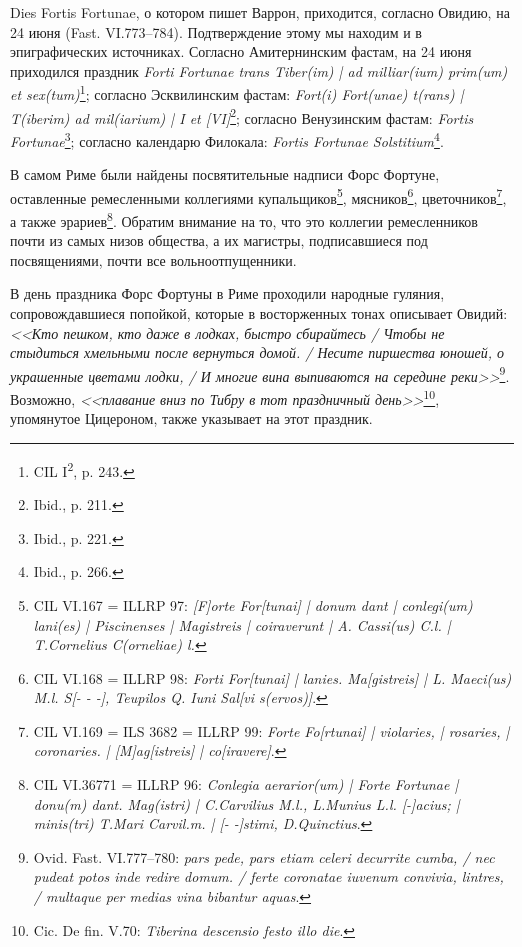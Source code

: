 
Dies Fortis Fortunae, о котором пишет Варрон, приходится, согласно Овидию, на 24 июня (Fast. VI.773--784). Подтверждение этому мы находим и в эпиграфических источниках. Согласно Амитернинским фастам, на 24 июня приходился праздник \textit{\label{Fastae}Forti Fortunae trans Tiber(im) | ad milliar(ium) prim(um) et sex(tum)}\footnote{CIL I\textsuperscript{2}, p. 243.}; согласно Эсквилинским фастам: \textit{Fort(i) Fort(unae) t(rans) | T(iberim) ad mil(iarium) | I et [VI]}\footnote{Ibid., p. 211.}; согласно Венузинским фастам: \textit{Fortis Fortunae}\footnote{Ibid., p. 221.}; согласно календарю Филокала: \textit{Fortis Fortunae Solstitium}\footnote{Ibid., p. 266.}.

В самом Риме были найдены посвятительные надписи Форс Фортуне, оставленные ремесленными коллегиями купальщиков\footnote{CIL VI.167 = ILLRP 97: \textit{[F]orte For[tunai] | donum dant | conlegi(um) lani(es) | Piscinenses | Magistreis | coiraverunt | A. Cassi(us) C.l. | T.Cornelius C(orneliae) l.}}, мясников\footnote{CIL VI.168 = ILLRP 98: \textit{Forti For[tunai] | lanies. Ma[gistreis] | L. Maeci(us) M.l. S[- - -], Teupilos Q. Iuni Sal[vi s(ervos)]}.}, цветочников\footnote{CIL VI.169 = ILS 3682 = ILLRP 99: \textit{Forte Fo[rtunai] | violaries, | rosaries, | coronaries. | [M]ag[istreis] | co[iravere]}.}, а также эрариев\footnote{CIL VI.36771 = ILLRP 96: \textit{Conlegia aerarior(um) | Forte Fortunae | donu(m) dant. Mag(istri) | C.Carvilius M.l., L.Munius L.l. [-]acius; | minis(tri) T.Mari Carvil.m. | [- -]stimi, D.Quinctius}.}. Обратим внимание на то, что это коллегии ремесленников почти из самых низов общества, а их магистры, подписавшиеся под посвящениями, почти все вольноотпущенники.


В день праздника Форс Фортуны в Риме проходили народные гуляния, сопровождавшиеся попойкой, которые в восторженных тонах описывает Овидий: \textit{<<Кто пешком, кто даже в лодках, быстро сбирайтесь / Чтобы не стыдиться хмельными после вернуться домой. / Несите пиршества юношей, о украшенные цветами лодки, / И многие вина выпиваются на середине реки>>}\footnote{Ovid. Fast. VI.777--780: \textit{pars pede, pars etiam celeri decurrite cumba, / nec pudeat potos inde redire domum. / ferte coronatae iuvenum convivia, lintres, / multaque per medias vina bibantur aquas}.}. Возможно, \textit{<<плавание вниз по Тибру в тот праздничный день>>}\footnote{Cic. De fin. V.70: \textit{Tiberina descensio festo illo die}.}, упомянутое Цицероном, также указывает на этот праздник.

